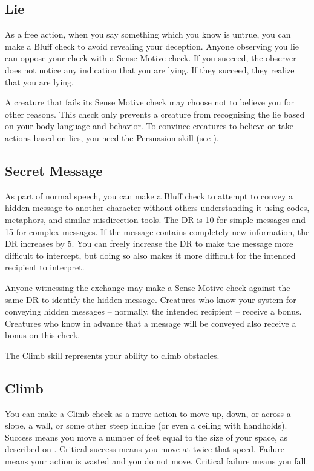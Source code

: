    \subsection{Lie}
        As a free action, when you say something which you know is untrue, you can make a Bluff check to avoid revealing your deception.
        Anyone observing you lie can oppose your check with a Sense Motive check.
        If you succeed, the observer does not notice any indication that you are lying.
        If they succeed, they realize that you are lying.

        A creature that fails its Sense Motive check may choose not to believe you for other reasons.
        This check only prevents a creature from recognizing the lie based on your body language and behavior.
        To convince creatures to believe or take actions based on lies, you need the Persuasion skill (see ).

    \subsection{Secret Message}
        As part of normal speech, you can make a Bluff check to attempt to convey a hidden message to another character without others understanding it using codes, metaphors, and similar misdirection tools. The DR is 10 for simple messages and 15 for complex messages. If the message contains completely new information, the DR increases by 5. You can freely increase the DR to make the message more difficult to intercept, but doing so also makes it more difficult for the intended recipient to interpret.

        Anyone witnessing the exchange may make a Sense Motive check against the same DR to identify the hidden message.
        Creatures who know your system for conveying hidden messages -- normally, the intended recipient -- receive a  bonus.
        Creatures who know in advance that a message will be conveyed also receive a  bonus on this check.

\newpage
{}
    The Climb skill represents your ability to climb obstacles.

    \subsection{Climb}
        You can make a Climb check as a move action to move up, down, or across a slope, a wall, or some other steep incline (or even a ceiling with handholds). Success means you move a number of feet equal to the size of your space, as described on . Critical success means you move at twice that speed. Failure means your action is wasted and you do not move. Critical failure means you fall.

